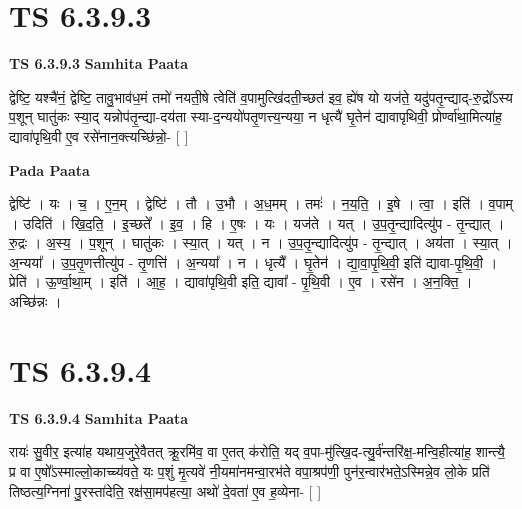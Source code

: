 \documentclass[17pt]{extarticle}
\begin{document}
\section*{ TS 6.3.9.3 }

\textbf{TS 6.3.9.3 } \newline
\textbf{Samhita Paata} \newline

द्वेष्टि॒ यश्चै॑नं॒ द्वेष्टि॒ तावु॒भाव॑ध॒मं तमो॑ नयती॒षे त्वेति॑ व॒पामुत्खि॑दती॒च्छत॑ इव॒ ह्ये॑ष यो यज॑ते॒ यदु॑पतृ॒न्द्याद्-रु॒द्रो᳚ऽस्य प॒शून् घातु॑कः स्या॒द् यन्नोप॑तृ॒न्द्या-दय॑ता स्या-द॒न्ययो॑पतृ॒णत्त्य॒न्यया॒ न धृत्यै॑ घृ॒तेन॑ द्यावापृथिवी॒ प्रोर्ण्वा॑था॒मित्या॑ह॒ द्यावा॑पृथि॒वी ए॒व रसे॑नान॒क्त्यच्छि॑न्नो॒- [  ] \newline

\textbf{Pada Paata} \newline

द्वेष्टि॑ । यः । च॒ । ए॒न॒म् । द्वेष्टि॑ । तौ । उ॒भौ । अ॒ध॒मम् । तमः॑ । न॒य॒ति॒ । इ॒षे । त्वा॒ । इति॑ । व॒पाम् । उदिति॑ । खि॒द॒ति॒ । इ॒च्छते᳚ । इ॒व॒ । हि । ए॒षः । यः । यज॑ते । यत् । उ॒प॒तृ॒न्द्यादित्यु॑प - तृ॒न्द्यात् । रु॒द्रः । अ॒स्य॒ । प॒शून् । घातु॑कः । स्या॒त् । यत् । न । उ॒प॒तृ॒न्द्यादित्यु॑प - तृ॒न्द्यात् । अय॑ता । स्या॒त् । अ॒न्यया᳚ । उ॒प॒तृ॒णत्तीत्यु॑प - तृ॒णत्ति॑ । अ॒न्यया᳚ । न । धृत्यै᳚ । घृ॒तेन॑ । द्या॒वा॒पृ॒थि॒वी॒ इति॑ द्यावा-पृ॒थि॒वी॒ । प्रेति॑ । ऊ॒र्ण्वा॒था॒म् । इति॑ । आ॒ह॒ । द्यावा॑पृथि॒वी इति॒ द्यावा᳚ - पृ॒थि॒वी । ए॒व । रसे॑न । अ॒न॒क्ति॒ । अच्छि॑न्नः ।  \newline




\section*{ TS 6.3.9.4 }

\textbf{TS 6.3.9.4 } \newline
\textbf{Samhita Paata} \newline

रायः॑ सु॒वीर॒ इत्या॑ह यथाय॒जुरे॒वैतत् क्रू॒रमि॑व॒ वा ए॒तत् क॑रोति॒ यद् व॒पा-मु॑त्खि॒द-त्यु॒र्व॑न्तरि॑क्ष॒-मन्वि॒हीत्या॑ह॒ शान्त्यै॒ प्र वा ए॒षो᳚ऽस्माल्लो॒काच्च्य॑वते॒ यः प॒शुं मृ॒त्यवे॑ नी॒यमा॑नमन्वा॒रभ॑ते वपा॒श्रप॑णी॒ पुन॑र॒न्वार॑भते॒ऽस्मिन्ने॒व लो॒के प्रति॑ तिष्ठत्य॒ग्निना॑ पु॒रस्ता॑देति॒ रक्ष॑सा॒मप॑हत्या॒ अथो॑ दे॒वता॑ ए॒व ह॒व्येना- [  ] \newline
\end{document}
